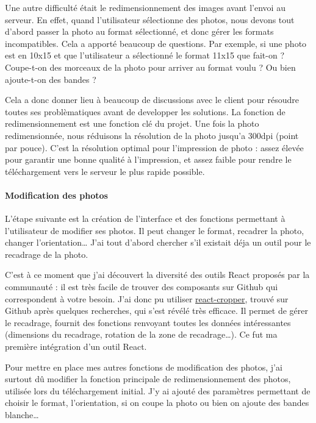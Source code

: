 \bigskip

Une autre difficulté était le redimensionnement des images avant l'envoi
au serveur. En effet, quand l'utilisateur sélectionne des photos, nous
devons tout d'abord passer la photo au format sélectionné, et donc gérer
les formats incompatibles. Cela a apporté beaucoup de questions. Par
exemple, si une photo est en 10x15 et que l'utilisateur a sélectionné le
format 11x15 que fait-on ? Coupe-t-on des morceaux de la photo pour
arriver au format voulu ? Ou bien ajoute-t-on des bandes ?

\bigskip

Cela a donc donner lieu à beaucoup de discussions avec le client pour
résoudre toutes ses problèmatiques avant de developper les solutions. La
fonction de redimensionnement est une fonction clé du projet. Une fois
la photo redimensionnée, nous réduisons la résolution de la photo
jusqu'a 300dpi (point par pouce). C'est la résolution optimal pour
l'impression de photo : assez élevée pour garantir une bonne qualité à
l'impression, et assez faible pour rendre le téléchargement vers le
serveur le plus rapide possible.

\bigskip

\paragraph{Modification des photos}\label{modification-des-photos}

\bigskip

L'étape suivante est la création de l'interface et des fonctions
permettant à l'utilisateur de modifier ses photos. Il peut changer le
format, recadrer la photo, changer l'orientation\ldots{} J'ai tout
d'abord chercher s'il existait déja un outil pour le recadrage de la
photo.

\bigskip

C'est à ce moment que j'ai découvert la diversité des outils React
proposés par la communauté : il est très facile de trouver des
composants sur Github qui correspondent à votre besoin. J'ai donc pu
utiliser
\href{https://github.com/roadmanfong/react-cropper}{react-cropper},
trouvé sur Github après quelques recherches, qui s'est révélé très
efficace. Il permet de gérer le recadrage, fournit des fonctions
renvoyant toutes les données intéressantes (dimensions du recadrage,
rotation de la zone de recadrage\ldots{}). Ce fut ma première
intégration d'un outil React.

\bigskip

Pour mettre en place mes autres fonctions de modification des photos,
j'ai surtout dû modifier la fonction principale de redimensionnement des
photos, utilisée lors du téléchargement initial. J'y ai ajouté des
paramètres permettant de choisir le format, l'orientation, si on coupe
la photo ou bien on ajoute des bandes blanche\ldots{}


